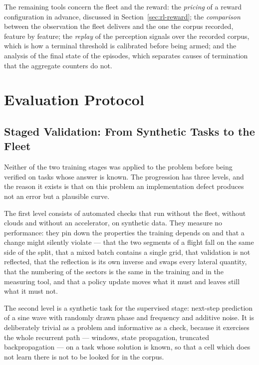 The remaining tools concern the fleet and the reward: the \emph{pricing} of a
reward configuration in advance, discussed in Section~\ref{sec:rl-reward}; the
\emph{comparison} between the observation the fleet delivers and the one the
corpus recorded, feature by feature; the \emph{replay} of the perception signals
over the recorded corpus, which is how a terminal threshold is calibrated before
being armed; and the analysis of the final state of the episodes, which
separates causes of termination that the aggregate counters do not.

\section{Evaluation Protocol}
\label{sec:exp-protocol}

\subsection{Staged Validation: From Synthetic Tasks to the Fleet}

Neither of the two training stages was applied to the problem before being
verified on tasks whose answer is known. The progression has three levels, and
the reason it exists is that on this problem an implementation defect produces
not an error but a plausible curve.

The first level consists of automated checks that run without the fleet, without
clouds and without an accelerator, on synthetic data. They measure no
performance: they pin down the properties the training depends on and that a
change might silently violate --- that the two segments of a flight fall on the
same side of the split, that a mixed batch contains a single grid, that
validation is not reflected, that the reflection is its own inverse and swaps
every lateral quantity, that the numbering of the sectors is the same in the
training and in the measuring tool, and that a policy update moves what it must
and leaves still what it must not.

The second level is a synthetic task for the supervised stage: next-step
prediction of a sine wave with randomly drawn phase and frequency and additive
noise. It is deliberately trivial as a problem and informative as a check,
because it exercises the whole recurrent path --- windows, state propagation,
truncated backpropagation --- on a task whose solution is known, so that a cell
which does not learn there is not to be looked for in the corpus.

